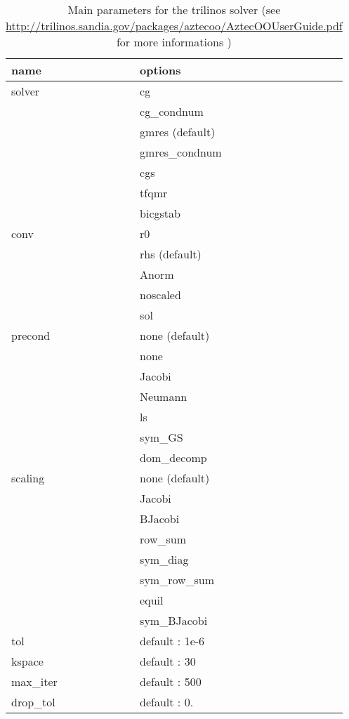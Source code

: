 \begin{table}
\begin{center}
\begin{tabular}{l|l}
name & options\\
\hline
solver & cg \\
& cg\_condnum\\
& gmres (default)\\
& gmres\_condnum\\
& cgs\\
& tfqmr\\
& bicgstab\\

\hline
conv & r0\\
& rhs (default) \\
& Anorm  \\
& noscaled  \\
& sol \\
\hline

precond & none (default) \\
& none \\
&Jacobi \\
&Neumann \\
&ls \\
&sym\_GS \\
&dom\_decomp \\
\hline

scaling & none (default) \\
&    Jacobi \\
&    BJacobi \\
&    row\_sum \\
&    sym\_diag \\
&    sym\_row\_sum \\
&    equil \\
&    sym\_BJacobi \\

\hline

tol   & default : 1e-6  \\

\hline

kspace & default : 30  \\

\hline

max\_iter & default : 500  \\

\hline

drop\_tol & default : 0. \\

\hline

\end{tabular}
\end{center}
\caption{Main parameters for the trilinos solver (see \url{
http://trilinos.sandia.gov/packages/aztecoo/AztecOOUserGuide.pdf} for more informations )
}
\label{table-solveroptions}
\end{table}

